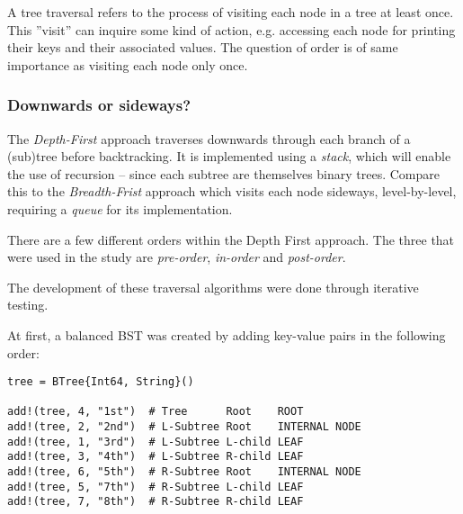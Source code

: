 \documentclass[a4paper, 11pt]{article}
\begin{document}
    A tree traversal refers to the process of visiting each node in a tree at least once. 
    This ''visit'' can inquire some kind of action, 
    e.g. accessing each node for printing their keys and their associated values. 
    The question of order is of same importance as visiting each node only once. 
    
    \subsubsection*{Downwards or sideways?}
    \label{sec:breadthfirsttraversal}
    The \emph{Depth-First} approach traverses downwards through each branch of a (sub)tree
    before backtracking. It is implemented using a \emph{stack}, which will enable 
    the use of recursion -- since each subtree are themselves binary trees. Compare
    this to the \emph{Breadth-Frist} approach which visits each node sideways,
    level-by-level, requiring a \emph{queue} for its implementation.
    
    There are a few different orders within the Depth First approach. 
    The three that were used in the study are 
    \emph{pre-order}, \emph{in-order} and \emph{post-order}. 

    The development of these traversal algorithms were done 
    through iterative testing. 

    At first, a balanced BST was created by adding key-value pairs in the following 
    order: 
    \begin{verbatim}
tree = BTree{Int64, String}()

add!(tree, 4, "1st")  # Tree      Root    ROOT
add!(tree, 2, "2nd")  # L-Subtree Root    INTERNAL NODE
add!(tree, 1, "3rd")  # L-Subtree L-child LEAF
add!(tree, 3, "4th")  # L-Subtree R-child LEAF
add!(tree, 6, "5th")  # R-Subtree Root    INTERNAL NODE
add!(tree, 5, "7th")  # R-Subtree L-child LEAF
add!(tree, 7, "8th")  # R-Subtree R-child LEAF
    \end{verbatim}
    
\end{document}
